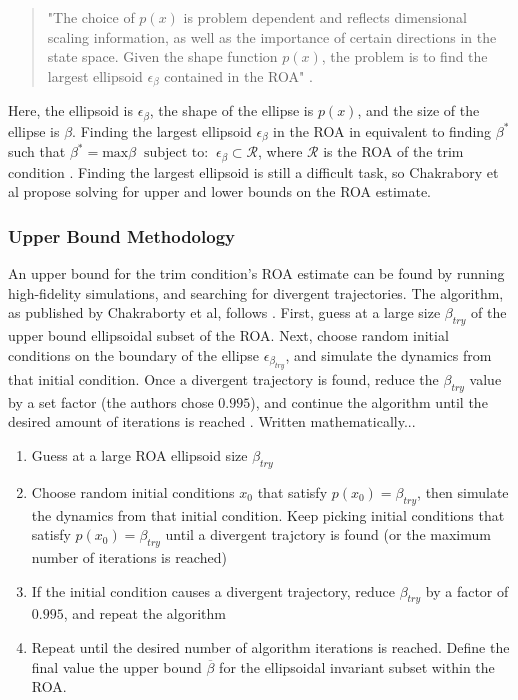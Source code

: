 \documentclass[%
 reprint,
 amsmath,amssymb,
 aps,
]{revtex4-2}
\begin{document}
\begin{quote}
"The choice of $p(x)$ is problem dependent and reflects dimensional scaling information, as well as the importance of certain directions in the state space. Given the shape function $p(x)$, the problem is to find the largest ellipsoid $\epsilon_\beta$ contained in the ROA" \cite{primary}.
\end{quote}

Here, the ellipsoid is $\epsilon_\beta$, the shape of the ellipse is $p(x)$, and the size of the ellipse is $\beta$. Finding the largest ellipsoid $\epsilon_\beta$ in the ROA in equivalent to finding $\beta^*$ such that $\beta^* = \text{max}\beta\ \text{ subject to: }\ \epsilon_\beta \subset \mathcal{R}$, where $\mathcal{R}$ is the ROA of the trim condition \cite{primary}. Finding the largest ellipsoid is still a difficult task, so Chakrabory et al propose solving for upper and lower bounds on the ROA estimate. 

\subsubsection{Upper Bound Methodology}
An upper bound for the trim condition's ROA estimate can be found by running high-fidelity simulations, and searching for divergent trajectories. The algorithm, as published by Chakraborty et al, follows \cite{primary}. First, guess at a large size $\beta_{try}$ of the upper bound ellipsoidal subset of the ROA. Next, choose random initial conditions on the boundary of the ellipse $\epsilon_\beta_{try}$, and simulate the dynamics from that initial condition. Once a divergent trajectory is found, reduce the $\beta_{try}$ value by a set factor (the authors chose $0.995$), and continue the algorithm until the desired amount of iterations is reached \cite{primary}. Written mathematically... \cite{primary}

\begin{enumerate}
    \item Guess at a large ROA ellipsoid size $\beta_{try}$
    \item Choose random initial conditions $x_0$ that satisfy $p(x_0)=\beta_{try}$, then simulate the dynamics from that initial condition. Keep picking initial conditions that satisfy $p(x_0)=\beta_{try}$ until a divergent trajctory is found (or the maximum number of iterations is reached)
    \item If the initial condition causes a divergent trajectory, reduce $\beta_{try}$ by a factor of $0.995$, and repeat the algorithm
    \item Repeat until the desired number of algorithm iterations is reached. Define the final value the upper bound $\overline{\beta}$ for the ellipsoidal invariant subset within the ROA.
\end{enumerate} 
\end{document}
